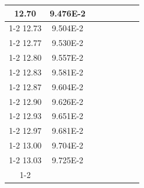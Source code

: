 \documentclass[article,12pt]{elsarticle}
\begin{document}
\begin{longtable}[c]{|c|c|cccccc}
12.70    & 9.476E-2  &                       &                              &                            &                       &                              &                               \\ \cline{1-2}
12.73    & 9.504E-2  &                       &                              &                            &                       &                              &                               \\ \cline{1-2}
12.77    & 9.530E-2  &                       &                              &                            &                       &                              &                               \\ \cline{1-2}
12.80    & 9.557E-2  &                       &                              &                            &                       &                              &                               \\ \cline{1-2}
12.83    & 9.581E-2  &                       &                              &                            &                       &                              &                               \\ \cline{1-2}
12.87    & 9.604E-2  &                       &                              &                            &                       &                              &                               \\ \cline{1-2}
12.90    & 9.626E-2  &                       &                              &                            &                       &                              &                               \\ \cline{1-2}
12.93    & 9.651E-2  &                       &                              &                            &                       &                              &                               \\ \cline{1-2}
12.97    & 9.681E-2  &                       &                              &                            &                       &                              &                               \\ \cline{1-2}
13.00    & 9.704E-2  &                       &                              &                            &                       &                              &                               \\ \cline{1-2}
13.03    & 9.725E-2  &                       &                              &                            &                       &                              &                               \\ \cline{1-2}

\end{longtable}
\end{document}

